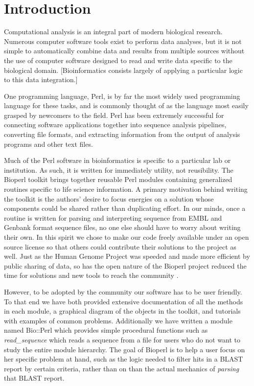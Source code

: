 \documentclass[12pt]{article}
\begin{document}
\section{Introduction}

Computational analysis is an integral part of modern biological
research.  Numerous computer software tools exist to perform 
data analyses, but it is not simple to automatically
combine data and results from multiple sources without the use of
computer software designed to read and write data specific to the
biological domain.  [Bioinformatics consists largely of applying a
particular logic to this data integration.]

One programming language, Perl, is by far the most widely used
programming language for these tasks, and is commonly thought of as
the language most easily grasped by newcomers to the field.  Perl has
been extremely successful for connecting software applications together into
sequence analysis pipelines, converting file formats, and extracting
information from the output of analysis programs and other text files.

Much of the Perl software in bioinformatics is specific to a
particular lab or institution.  As such, it is written for immediately utility, 
not reusibility.  The Bioperl toolkit brings together
reusable Perl modules containing generalized routines specific to
life science information.  A primary motivation behind
writing the toolkit is the authors' desire to focus energies on a
solution whose components could be shared rather than duplicating
effort.  In our minds, once a routine is written for parsing and
interpreting sequence from EMBL and Genbank format sequence files, no
one else should have to worry about writing their own.  In this spirit
we chose to make our code freely available under an open source
license \cite{open-source-ref} so that
others could contribute their solutions to the project as well.  Just
as the Human Genome Project was speeded and made more efficient by
public sharing of data, so has the open nature of the Bioperl project
reduced the time for solutions and new tools to reach the community
\cite{waterston}.

However, to be adopted by the community our software has to be user
friendly.  To that end we have both provided extensive documentation
of all the methods in each module, a graphical diagram of the objects
in the toolkit, and tutorials with examples of common problems.
Additionally we have written a module named Bio::Perl which provides
simple procedural functions such as \textit{read\_sequence} which
reads a sequence from a file for users who do not want to study the
entire module hierarchy.  The goal of Bioperl is to help a user focus
on her specific problem at hand, such as the logic needed to filter
hits in a BLAST \cite{blast} report by certain criteria, rather than
on than the actual mechanics of \textit{parsing} that BLAST report.
\end{document}
